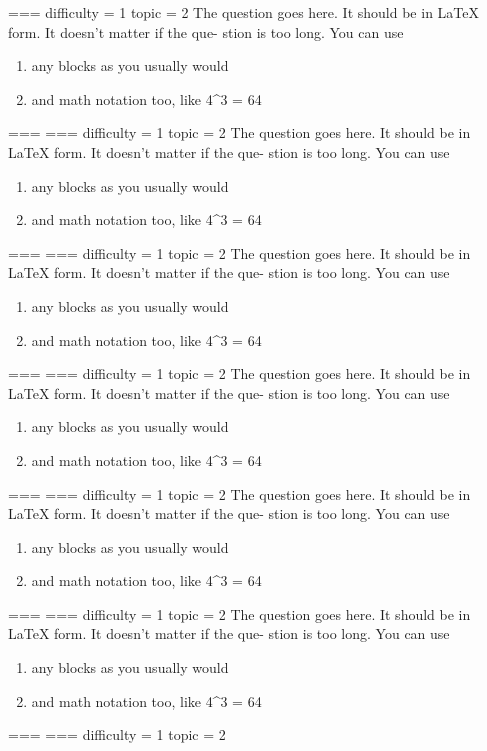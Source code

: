 ===
difficulty = 1
topic = 2
The question goes here. It should be in LaTeX form. It doesn't matter if the que-
stion is too long. You can use
\begin{enumerate}
    \item any blocks as you usually would
    \item and math notation too, like 4^3 = 64
\end{enumerate}
===
===
difficulty = 1
topic = 2
The question goes here. It should be in LaTeX form. It doesn't matter if the que-
stion is too long. You can use
\begin{enumerate}
    \item any blocks as you usually would
    \item and math notation too, like 4^3 = 64
\end{enumerate}
===
===
difficulty = 1
topic = 2
The question goes here. It should be in LaTeX form. It doesn't matter if the que-
stion is too long. You can use
\begin{enumerate}
    \item any blocks as you usually would
    \item and math notation too, like 4^3 = 64
\end{enumerate}
===
===
difficulty = 1
topic = 2
The question goes here. It should be in LaTeX form. It doesn't matter if the que-
stion is too long. You can use
\begin{enumerate}
    \item any blocks as you usually would
    \item and math notation too, like 4^3 = 64
\end{enumerate}
===
===
difficulty = 1
topic = 2
The question goes here. It should be in LaTeX form. It doesn't matter if the que-
stion is too long. You can use
\begin{enumerate}
    \item any blocks as you usually would
    \item and math notation too, like 4^3 = 64
\end{enumerate}
===
===
difficulty = 1
topic = 2
The question goes here. It should be in LaTeX form. It doesn't matter if the que-
stion is too long. You can use
\begin{enumerate}
    \item any blocks as you usually would
    \item and math notation too, like 4^3 = 64
\end{enumerate}
===
===
difficulty = 1
topic = 2
